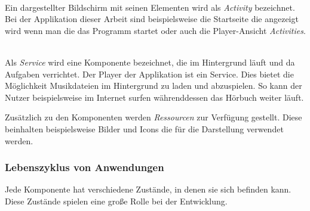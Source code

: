 \begin{description}[style=nextline]

	\item[Activities] \hfill \\
	Ein dargestellter Bildschirm mit seinen Elementen wird als \emph{Activity} bezeichnet. Bei der Applikation dieser Arbeit sind beispielsweise die Startseite die angezeigt wird wenn man die das Programm startet oder auch die Player-Ansicht \emph{Activities}.
	
	\item[Services] \hfill \\
	Als \emph{Service} wird eine Komponente bezeichnet, die im Hintergrund läuft und da Aufgaben verrichtet. Der Player der Applikation ist ein Service. Dies bietet die Möglichkeit Musikdateien im Hintergrund zu laden und abzuspielen. So kann der Nutzer beispielsweise im Internet surfen währenddessen das Hörbuch weiter läuft.
	
\end{description}

Zusätzlich zu den Komponenten werden \emph{Ressourcen} zur Verfügung gestellt. Diese beinhalten beispielsweise Bilder und Icons die für die Darstellung verwendet werden.

\subsubsection{Lebenszyklus von Anwendungen}

Jede Komponente hat verschiedene Zustände, in denen sie sich befinden kann. Diese Zustände spielen eine große Rolle bei der Entwicklung. 

